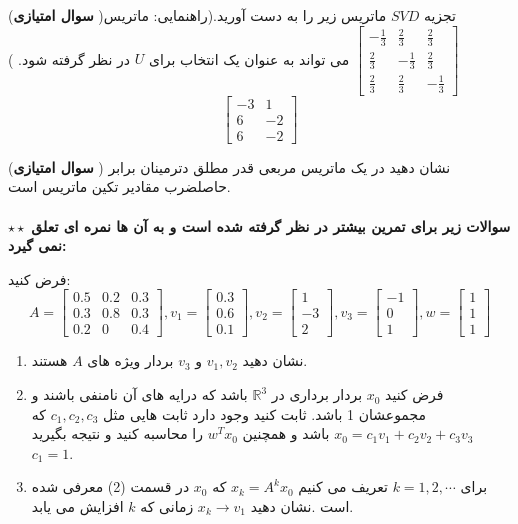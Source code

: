 \documentclass{article}
\begin{document}
	 ({\bf سوال امتیازی })تجزیه 
	$SVD$
	ماتریس زیر را به دست آورید.(راهنمایی:
	ماتریس
	$\begin{bmatrix}
	-\frac{1}{3}&\frac{2}{3}&\frac{2}{3}\\
	\frac{2}{3}&-\frac{1}{3}&\frac{2}{3}\\
	\frac{2}{3}&\frac{2}{3}&-\frac{1}{3}
	\end{bmatrix}$
	می تواند به عنوان یک انتخاب برای 
	$U$
	در نظر گرفته شود.
	)
	$$\begin{bmatrix}
	-3&1\\
	6&-2\\
	6&-2
	
	\end{bmatrix}$$
	
	({\bf سوال امتیازی }) نشان دهید در یک ماتریس مربعی قدر مطلق دترمینان برابر حاصلضرب مقادیر تکین ماتریس است. 
	\\
	\\
	$\star \star$
	{\bf  سوالات زیر برای تمرین بیشتر در نظر گرفته شده است و به آن ها نمره ای تعلق نمی گیرد:}
	
	 فرض کنید:
	$$A=\begin{bmatrix}
	0.5&0.2&0.3\\
	0.3&0.8&0.3\\
	0.2&0&0.4
	\end{bmatrix}
	,v_1=
	\begin{bmatrix}
	0.3\\
	0.6\\
	0.1
	\end{bmatrix}
	,v_2=
	\begin{bmatrix}
	1\\
	-3\\
	2
	\end{bmatrix}
	,
	v_3=
	\begin{bmatrix}
	-1\\
	0\\
	1
	\end{bmatrix}
	,
	w=
	\begin{bmatrix}
	1\\
	1\\
	1
	\end{bmatrix}
	$$
	\begin{enumerate}
		\item 
		نشان دهید 
		$v_1,v_2$
		و 
		$v_3$
		بردار ویژه های 
		$A$
		هستند.
		\item
		فرض کنید 
		$x_0$
		بردار برداری در 
		$\mathbb{R}^3$
		باشد که درایه های آن نامنفی باشند و مجموعشان 1 باشد. ثابت کنید وجود دارد ثابت هایی مثل 
		$c_1,c_2,c_3$
		که 
		$x_0=c_1v_1+c_2v_2+c_3v_3$
		باشد و همچنین 
		$w^{T}x_0$
		را محاسبه کنید و نتیجه بگیرید 
		$c_1=1$.
		
		\item 
		برای 
		$k=1,2,\cdots$
		تعریف می کنیم 
		$x_k=A^kx_0$
		که 
		$x_0$
		در قسمت (2) معرفی شده است .نشان دهید 
		$x_k\to v_1$
		زمانی که 
		$k$
		افزایش می یابد.
	\end{enumerate}
	
\end{document}
